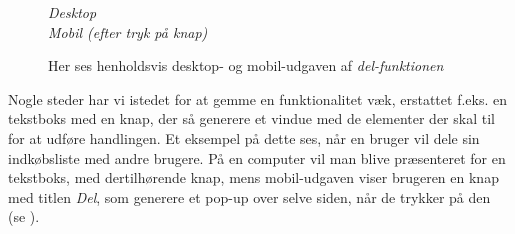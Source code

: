 \begin{figure}
\vspace{-30pt}
\begin{center}
\textit{Desktop}
\\
\vspace{10pt}
\textit{Mobil (efter tryk på knap)}
\end{center}
\vspace{-10pt}
\caption{Her ses henholdsvis desktop- og mobil-udgaven af \textit{del-funktionen}}\label{ss:share_diffs}
\vspace{-30pt}
\end{figure}
Nogle steder har vi istedet for at gemme en funktionalitet væk, erstattet f.eks. en tekstboks med en knap, der så generere et vindue med de elementer der skal til for at udføre handlingen. 
Et eksempel på dette ses, når en bruger vil dele sin indkøbsliste med andre brugere.
På en computer vil man blive præsenteret for en tekstboks, med dertilhørende knap, mens mobil-udgaven viser brugeren en knap med titlen \textit{Del}, som generere et pop-up over selve siden, når de trykker på den (se  ).

